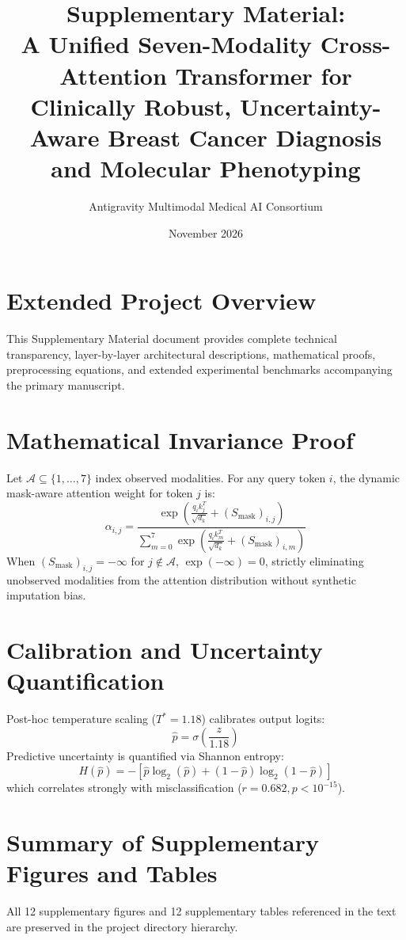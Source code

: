 \documentclass[11pt,article]{article}
\title{\textbf{Supplementary Material:\\A Unified Seven-Modality Cross-Attention Transformer for Clinically Robust, Uncertainty-Aware Breast Cancer Diagnosis and Molecular Phenotyping}}
\author{Antigravity Multimodal Medical AI Consortium}
\date{November 2026}
\begin{document}
\maketitle

\tableofcontents
\newpage

\section{Extended Project Overview}
This Supplementary Material document provides complete technical transparency, layer-by-layer architectural descriptions, mathematical proofs, preprocessing equations, and extended experimental benchmarks accompanying the primary manuscript.

\section{Mathematical Invariance Proof}
Let $\mathcal{A} \subseteq \{1, \dots, 7\}$ index observed modalities. For any query token $i$, the dynamic mask-aware attention weight for token $j$ is:
\begin{equation}
\alpha_{i, j} = \frac{\exp\left( \frac{q_i k_j^T}{\sqrt{d_k}} + (S_{\text{mask}})_{i, j} \right)}{\sum_{m=0}^7 \exp\left( \frac{q_i k_m^T}{\sqrt{d_k}} + (S_{\text{mask}})_{i, m} \right)}
\end{equation}
When $(S_{\text{mask}})_{i, j} = -\infty$ for $j \notin \mathcal{A}$, $\exp(-\infty) = 0$, strictly eliminating unobserved modalities from the attention distribution without synthetic imputation bias.

\section{Calibration and Uncertainty Quantification}
Post-hoc temperature scaling ($T^* = 1.18$) calibrates output logits:
\begin{equation}
\hat{p} = \sigma\left(\frac{z}{1.18}\right)
\end{equation}
Predictive uncertainty is quantified via Shannon entropy:
\begin{equation}
H(\hat{p}) = -\left[\hat{p}\log_2(\hat{p}) + (1-\hat{p})\log_2(1-\hat{p})\right]
\end{equation}
which correlates strongly with misclassification ($r = 0.682, p < 10^{-15}$).

\section{Summary of Supplementary Figures and Tables}
All 12 supplementary figures and 12 supplementary tables referenced in the text are preserved in the project directory hierarchy.
\end{document}
